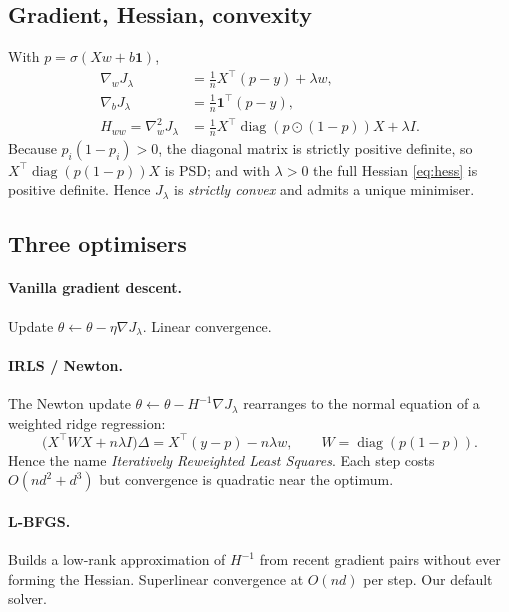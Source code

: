 \documentclass[11pt]{article}
\newcommand{\sigmoid}{\sigma}
\newcommand{\diag}{\operatorname{diag}}
\begin{document}
\subsection{Gradient, Hessian, convexity}

With $p = \sigmoid(Xw + b\mathbf{1})$,
\begin{align}
  \nabla_w J_\lambda &= \tfrac{1}{n}X^\top (p - y) + \lambda w,
  \label{eq:gradw}\\
  \nabla_b J_\lambda &= \tfrac{1}{n}\mathbf{1}^\top (p - y),
  \label{eq:gradb}\\
  H_{ww} = \nabla_w^2 J_\lambda &= \tfrac{1}{n}X^\top \diag(p \odot (1-p)) X + \lambda I.
  \label{eq:hess}
\end{align}
Because $p_i(1-p_i) > 0$, the diagonal matrix is strictly positive
definite, so $X^\top \diag(p(1-p)) X$ is PSD; and with $\lambda > 0$
the full Hessian \eqref{eq:hess} is positive definite. Hence
$J_\lambda$ is \emph{strictly convex} and admits a unique minimiser.

\subsection{Three optimisers}

\paragraph{Vanilla gradient descent.} Update $\theta \leftarrow \theta -
\eta \nabla J_\lambda$. Linear convergence.

\paragraph{IRLS / Newton.} The Newton update $\theta \leftarrow \theta -
H^{-1}\nabla J_\lambda$ rearranges to the normal equation of a weighted
ridge regression:
\begin{equation}\label{eq:irls}
  \bigl(X^\top W X + n\lambda I\bigr) \Delta = X^\top (y - p) - n\lambda w,
  \qquad W = \diag(p(1-p)).
\end{equation}
Hence the name \emph{Iteratively Reweighted Least Squares}. Each step
costs $O(nd^2 + d^3)$ but convergence is quadratic near the optimum.

\paragraph{L-BFGS.} Builds a low-rank approximation of $H^{-1}$ from
recent gradient pairs without ever forming the Hessian. Superlinear
convergence at $O(nd)$ per step. Our default solver.
\end{document}

